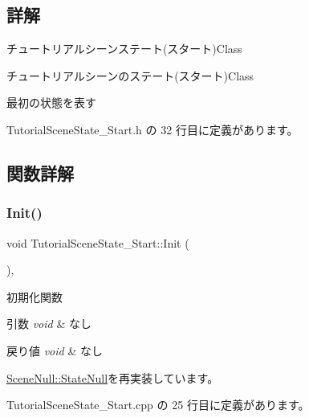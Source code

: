 \subsection{詳解}
チュートリアルシーンステート(スタート)Class 

チュートリアルシーンのステート(スタート)Class

最初の状態を表す 

 Tutorial\+Scene\+State\+\_\+\+Start.\+h の 32 行目に定義があります。



\subsection{関数詳解}
\mbox{\label{class_tutorial_scene_state___start_acd4cd7e4efeebffa9616d7ca31c7b1c0}} 
\subsubsection{\texorpdfstring{Init()}{Init()}}
{\footnotesize\ttfamily void Tutorial\+Scene\+State\+\_\+\+Start\+::\+Init (\begin{DoxyParamCaption}{ }\end{DoxyParamCaption})\hspace{0.3cm}{\ttfamily [override]}, {\ttfamily [virtual]}}



初期化関数 


\begin{DoxyParams}{引数}
{\em void} & なし \\
\hline
\end{DoxyParams}

\begin{DoxyRetVals}{戻り値}
{\em void} & なし \\
\hline
\end{DoxyRetVals}


\mbox{\hyperlink{class_scene_null_1_1_state_null_ac0b3f1adf01b580144337e37a847131f}{Scene\+Null\+::\+State\+Null}}を再実装しています。



 Tutorial\+Scene\+State\+\_\+\+Start.\+cpp の 25 行目に定義があります。

\mbox{\label{class_tutorial_scene_state___start_a93c322692bf56172f383d3e5b17cd85c}} 
